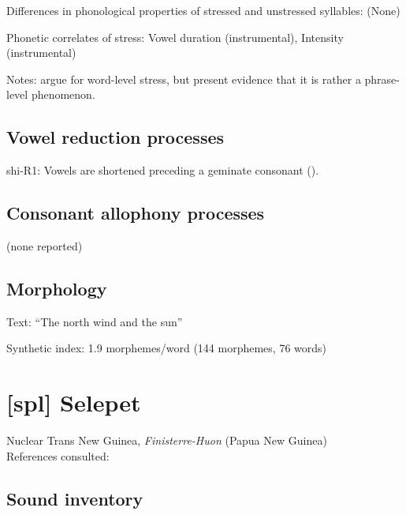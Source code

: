 {\begin{appendixdesc}
\item[Differences in phonological properties of stressed and unstressed syllables:] (None)

\item[Phonetic correlates of stress:] Vowel duration (instrumental), Intensity (instrumental)

\item[Notes:] \citet{GordonNafi2012} argue for word-level stress, but \citet{RoettgerEtAl2015} present evidence that it is rather a phrase-level phenomenon.
\end{appendixdesc}
\subsection*{Vowel reduction processes}
\begin{appendixdesc}

\item[shi-R1:] Vowels are shortened preceding a geminate consonant (\citealt{DellElmedlouai2002}).
\end{appendixdesc}
\subsection*{Consonant allophony processes}

(none reported)

\subsection*{Morphology}
\begin{appendixdesc}
\item[Text:] “The north wind and the sun” \citep[219]{Ridouane2014}

\item[Synthetic index:] 1.9 morphemes/word (144 morphemes, 76 words)
\end{appendixdesc}

\section*{[spl] Selepet}  %
Nuclear Trans New Guinea, \textit{Finisterre-Huon} (Papua New Guinea)\medskip\\
References consulted: \citet{McElhanon1970}

\subsection*{Sound inventory}
\begin{appendixdesc}


\end{appendixdesc}}
